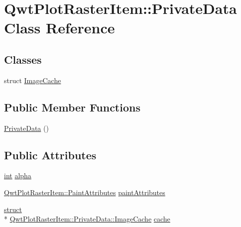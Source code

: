 \hypertarget{class_qwt_plot_raster_item_1_1_private_data}{\section{Qwt\-Plot\-Raster\-Item\-:\-:Private\-Data Class Reference}
\label{class_qwt_plot_raster_item_1_1_private_data}
}
\subsection*{Classes}
\begin{DoxyCompactItemize}
\item 
struct \hyperlink{struct_qwt_plot_raster_item_1_1_private_data_1_1_image_cache}{Image\-Cache}
\end{DoxyCompactItemize}
\subsection*{Public Member Functions}
\begin{DoxyCompactItemize}
\item 
\hyperlink{class_qwt_plot_raster_item_1_1_private_data_a8393484f60cce56be321f4cdcb5201a3}{Private\-Data} ()
\end{DoxyCompactItemize}
\subsection*{Public Attributes}
\begin{DoxyCompactItemize}
\item 
\hyperlink{ioapi_8h_a787fa3cf048117ba7123753c1e74fcd6}{int} \hyperlink{class_qwt_plot_raster_item_1_1_private_data_a6d460da08e2455431319fe6a58607bd6}{alpha}
\item 
\hyperlink{class_qwt_plot_raster_item_a6bde441d571c4943da01765dec2d4b4a}{Qwt\-Plot\-Raster\-Item\-::\-Paint\-Attributes} \hyperlink{class_qwt_plot_raster_item_1_1_private_data_a4833c1b42120a1530a7acc0e9bb4cd5c}{paint\-Attributes}
\item 
\hyperlink{sdlgamepad_8dox_aba655c5729da86df745f0c8e7f9ba8d2}{struct} \\*
\hyperlink{struct_qwt_plot_raster_item_1_1_private_data_1_1_image_cache}{Qwt\-Plot\-Raster\-Item\-::\-Private\-Data\-::\-Image\-Cache} \hyperlink{class_qwt_plot_raster_item_1_1_private_data_a146a44edc4df26a88b9c251fe0770a69}{cache}
\end{DoxyCompactItemize}


